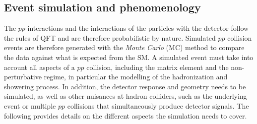 \subsection{Event simulation and phenomenology}
\label{subsec:event-simulation}


The $pp$ interactions and the interactions of the particles with the detector follow the rules of QFT and are therefore probabilistic by nature.
Simulated $pp$ collision events are therefore generated with the \emph{Monte Carlo} (MC) method to compare the data against what is expected from the SM.
A simulated event must take into account all aspects of a $pp$ collision, including the matrix element and the non-perturbative regime, in particular the modelling of the hadronization and showering process. In addition, the detector response and geometry needs to be simulated, as well as other nuisances at hadron colliders, such as the underlying event or multiple $pp$ collisions that simultaneously produce detector signals.
The following provides details on the different aspects the simulation needs to cover.

